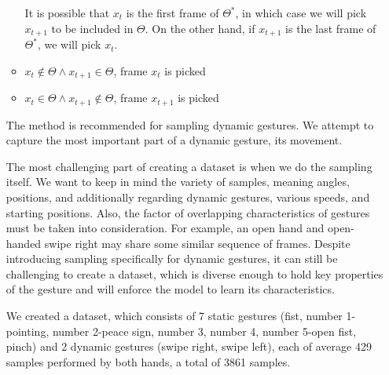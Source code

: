 \begin{enumerate}
\begin{itemize}
        It is possible that $x_t$ is the first frame of $\Theta^*$, in which case we will pick $x_{t+1}$ to be included in $\Theta$. On the other hand, if $x_{t+1}$ is the last frame of $\Theta^*$, we will pick $x_t$.
        
        \item $x_{t} \notin \Theta \land x_{t+1} \in \Theta$, frame $x_t$ is picked
        \item $x_{t} \in \Theta \land x_{t+1} \notin \Theta$, frame $x_{t+1}$ is picked
    \end{itemize}
    
    The method is recommended for sampling dynamic gestures. We attempt to capture the most important part of a dynamic gesture, its movement. 

    The most challenging part of creating a dataset is when we do the sampling itself. We want to keep in mind the variety of samples, meaning angles, positions, and additionally regarding dynamic gestures, various speeds, and starting positions. Also, the factor of overlapping characteristics of gestures must be taken into consideration. For example, an open hand and open-handed swipe right may share some similar sequence of frames. Despite introducing sampling specifically for dynamic gestures, it can still be challenging to create a dataset, which is diverse enough to hold key properties of the gesture and will enforce the model to learn its characteristics.

    We created a dataset, which consists of 7 static gestures (fist, number 1-pointing, number 2-peace sign, number 3, number 4, number 5-open fist, pinch) and 2 dynamic gestures (swipe right, swipe left), each of average 429 samples performed by both hands, a total of 3861 samples. 

    \begin{figure}[h]
        \centering
        \qquad
        \qquad
        \qquad
        \qquad
        \qquad
        \qquad
        \qquad


\end{figure}
\end{enumerate}
